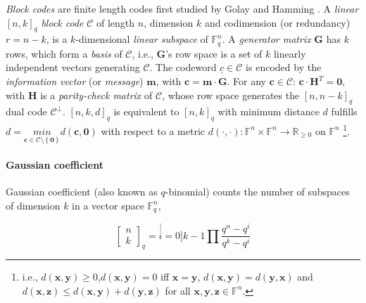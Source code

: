 \textit{Block codes} are finite length codes first studied by Golay
\cite{Golay:1949} and Hamming \cite{Hamming:1950}. A \textit{linear}
$\left[n,k\right]_{q}$ \textit{block code} $\ensuremath{\mathcal{C}}$
of length $n$, dimension $k$ and codimension (or redundancy) $r=n-k$,
is a $k$-dimensional \textit{linear subspace} of $\ensuremath{\mathbb{F}}_{q}^{n}$.
A \textit{generator matrix} $\boldsymbol{G}$ has $k$ rows, which
form a \textit{basis} of $\ensuremath{\mathcal{C}}$, i.e., $\boldsymbol{G}$'s
row space is a set of $k$ linearly independent vectors generating
$\ensuremath{\mathcal{C}}$. The codeword $\underline{c}\in\ensuremath{\mathcal{C}}$
is encoded by the \textit{information vector} (or \textit{message})
$\boldsymbol{m}$, with $\boldsymbol{c}=\boldsymbol{m}\cdot\boldsymbol{G}$.
For any $\boldsymbol{c}\in\ensuremath{\mathcal{C}}$: $\boldsymbol{c}\cdot\boldsymbol{H}^{T}=\boldsymbol{0}$,
with $\boldsymbol{H}$ is a \textit{parity-check matrix} of $\ensuremath{\mathcal{C}}$,
whose row space generates the $\left[n,n-k\right]_{q}$ dual code
$\ensuremath{\mathcal{C}}^{\perp}$. $\left[n,k,d\right]_{q}$ is
equivalent to $\left[n,k\right]_{q}$ with minimum distance $d$ fulfills
$d=\underset{\boldsymbol{c}\in\ensuremath{\mathcal{C}\setminus\left\{ \boldsymbol{0}\right\} }}{min}d\left(\boldsymbol{c},\boldsymbol{0}\right)$
with respect to a metric $d\left(\cdot,\cdot\right):\ensuremath{\mathbb{F}}^{n}\times\ensuremath{\mathbb{F}}^{n}\rightarrow\mathbb{R}_{\geq0}$
on $\ensuremath{\mathbb{F}}^{n}$ \footnote{i.e., $d\left(\boldsymbol{x},\boldsymbol{y}\right)\geq0$,$d\left(\boldsymbol{x},\boldsymbol{y}\right)=0$
iff $\boldsymbol{x}=\boldsymbol{y}$, $d\left(\boldsymbol{x},\boldsymbol{y}\right)=d\left(\boldsymbol{y},\boldsymbol{x}\right)$
and $d\left(\boldsymbol{x},\boldsymbol{z}\right)\leq d\left(\boldsymbol{x},\boldsymbol{y}\right)+d\left(\boldsymbol{y},\boldsymbol{z}\right)$
for all $\boldsymbol{x},\boldsymbol{y},\boldsymbol{z}\in\ensuremath{\mathbb{F}}^{n}$.}.

\paragraph{Gaussian coefficient}

Gaussian coefficient (also known as $q$-binomial) counts the number
of subspaces of dimension $k$ in a vector space $\ensuremath{\mathbb{F}}_{q}^{n}$,

\[
\left[\begin{array}{c}
n\\
k
\end{array}\right]_{q}=\stackrel[i=0]{k-1}{\prod}\frac{q^{n}-q^{i}}{q^{k}-q^{i}}
\]


